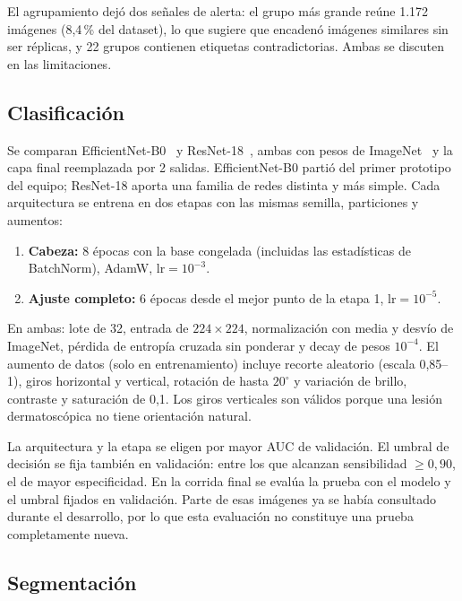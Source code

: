 \documentclass[conference]{IEEEtran}
\begin{document}
	El agrupamiento dejó dos señales de alerta: el grupo más grande reúne 1.172 imágenes (8,4\,\% del dataset), lo que sugiere que encadenó imágenes similares sin ser réplicas, y 22 grupos contienen etiquetas contradictorias. Ambas se discuten en las limitaciones.
	
	\subsection{Clasificación}
	
	Se comparan EfficientNet-B0~\cite{tan2019} y ResNet-18~\cite{he2016}, ambas con pesos de ImageNet~\cite{russakovsky2015} y la capa final reemplazada por 2 salidas. EfficientNet-B0 partió del primer prototipo del equipo; ResNet-18 aporta una familia de redes distinta y más simple. Cada arquitectura se entrena en dos etapas con las mismas semilla, particiones y aumentos:
	
	\begin{enumerate}
		\item \textbf{Cabeza:} 8 épocas con la base congelada (incluidas las estadísticas de BatchNorm), AdamW, $\mathrm{lr} = 10^{-3}$.
		\item \textbf{Ajuste completo:} 6 épocas desde el mejor punto de la etapa 1, $\mathrm{lr} = 10^{-5}$.
	\end{enumerate}
	
	En ambas: lote de 32, entrada de $224\times224$, normalización con media y desvío de ImageNet, pérdida de entropía cruzada sin ponderar y decay de pesos $10^{-4}$. El aumento de datos (solo en entrenamiento) incluye recorte aleatorio (escala 0,85--1), giros horizontal y vertical, rotación de hasta $20^{\circ}$ y variación de brillo, contraste y saturación de 0,1. Los giros verticales son válidos porque una lesión dermatoscópica no tiene orientación natural.
	
	La arquitectura y la etapa se eligen por mayor AUC de validación. El umbral de decisión se fija también en validación: entre los que alcanzan sensibilidad $\geq 0{,}90$, el de mayor especificidad. En la corrida final se evalúa la prueba con el modelo y el umbral fijados en validación. Parte de esas imágenes ya se había consultado durante el desarrollo, por lo que esta evaluación no constituye una prueba completamente nueva.
	
	\subsection{Segmentación}
	
\end{document}
